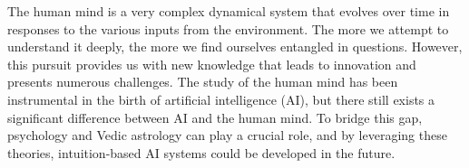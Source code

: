 The human mind is a very complex dynamical system that evolves over time in responses to the various inputs from the environment. The more we attempt to understand it deeply, the more we find ourselves entangled in questions. However, this pursuit provides us with new knowledge that leads to innovation and presents numerous challenges. The study of the human mind has been instrumental in the birth of artificial intelligence (AI), but there still exists a significant difference between AI and the human mind. To bridge this gap, psychology and Vedic astrology can play a crucial role, and by leveraging these theories, intuition-based AI systems could be developed in the future.
\vspace{1\baselineskip}